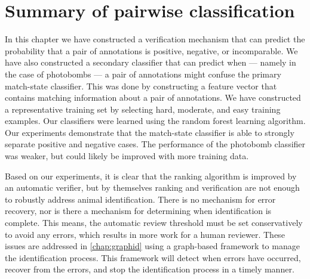 \section{Summary of pairwise classification}\label{sec:pairconclusion}

    In this chapter we have constructed a verification mechanism that can predict the probability that a pair of
    annotations is positive, negative, or incomparable. We have also constructed a secondary classifier that can
    predict when --- namely in the case of photobombs --- a pair of annotations might confuse the primary
    match-state classifier. This was done by constructing a feature vector that contains matching information about
    a pair of annotations. We have constructed a representative training set by selecting hard, moderate, and easy
    training examples. Our classifiers were learned using the random forest learning algorithm. Our experiments
    demonstrate that the match-state classifier is able to strongly separate positive and negative cases. The
    performance of the photobomb classifier was weaker, but could likely be improved with more training data.

    Based on our experiments, it is clear that the ranking algorithm is improved by an automatic verifier, but by
      themselves ranking and verification are not enough to robustly address animal identification.
    There is no mechanism for error recovery, nor is there a mechanism for determining when identification is
      complete.
    This means, the automatic review threshold must be set conservatively to avoid any errors, which results in
      more work for a human reviewer.
    These issues are addressed in \cref{chap:graphid} using a graph-based framework to manage the identification
      process.
    This framework will detect when errors have occurred, recover from the errors, and stop the identification
      process in a timely manner.
